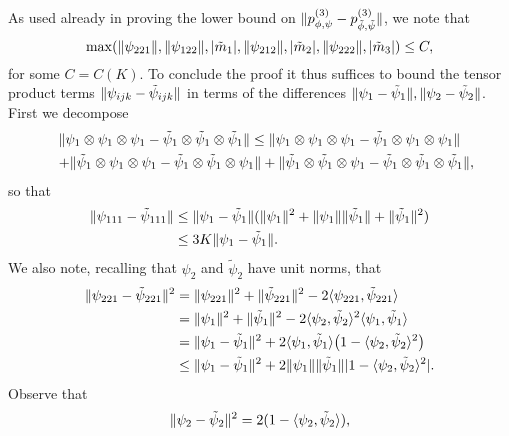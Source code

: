 \documentclass[journal]{IEEEtran}
\newcommand{\1}{\boldsymbol{1}}
\DeclarePairedDelimiter{\Inner}{\langle}{\rangle}
\DeclarePairedDelimiter{\brackets}{(}{)}
\DeclarePairedDelimiter{\norm}{\lVert}{\rVert}
\DeclarePairedDelimiter{\abs}{\lvert}{\rvert}
\begin{document}
As used already in proving the lower bound on $\norm{p^{(3)}_{\phi,\psi}-p^{(3)}_{\tilde{\phi},\tilde{\psi}}}$, we note that
\begin{equation*} %
	\max(\norm{\psi_{221}},\norm{\psi_{122}},\abs{\tilde{m}_1},\norm{\psi_{212}},\abs{\tilde{m}_2},\norm{\psi_{222}},\abs{\tilde{m}_3})\leq C,
\end{equation*}
for some $C=C(K)$.
To conclude the proof it thus suffices to bound the tensor product terms $\norm{\psi_{ijk}-\tilde{\psi}_{ijk}}$ in terms of the differences $\norm{\psi_1-\tilde{\psi}_1}, \norm{\psi_2-\tilde{\psi}_2}$.
First we decompose
\begin{multline*}
	\norm{\psi_1 \otimes \psi_1 \otimes \psi_1 - \tilde{\psi}_1 \otimes \tilde{\psi}_1 \otimes \tilde{\psi}_1}%
	\leq  \norm{\psi_1 \otimes \psi_1 \otimes \psi_1 - \tilde{\psi}_1 \otimes \psi_1 \otimes \psi_1}\\%
	\quad	+ \norm{\tilde{\psi}_1 \otimes \psi_1 \otimes \psi_1 - \tilde{\psi}_1 \otimes \tilde{\psi}_1 \otimes \psi_1}%
	+ \norm{\tilde{\psi}_1 \otimes \tilde{\psi}_1 \otimes \psi_1 - \tilde{\psi}_1 \otimes \tilde{\psi}_1 \otimes \tilde{\psi}_1},
\end{multline*}
so that
\begin{align}
  \norm{\psi_{111}-\tilde{\psi}_{111}}%
  &\leq \norm{\psi_1-\tilde{\psi}_1}(\norm{\psi_1}^2+\norm{\psi_1}\norm{\tilde{\psi}_1}+\norm{\tilde{\psi}_1}^2) \nonumber\\
  \label{eq:44}
  &\leq 3K\norm{\psi_1-\tilde{\psi}_1}.
\end{align}
We also note, recalling that $\psi_2$ and $\tilde{\psi}_2$ have unit norms, that
\begin{align*}
	\norm{\psi_{221} - \tilde{\psi}_{221}}^2%
	&= \norm{\psi_{221}}^2 + \norm{\tilde{\psi}_{221}}^2 - 2\Inner{\psi_{221},\tilde{\psi}_{221}}\\
	&= \norm{\psi_1}^2 + \norm{\tilde{\psi}_1}^2 - 2\Inner{\psi_2,\tilde{\psi}_2}^2\Inner{\psi_1,\tilde{\psi}_1}\\
	&= \norm{\psi_1 - \tilde{\psi}_1}^2 +2 \Inner{\psi_1,\tilde{\psi}_1}\brackets[\big]{1-\Inner{\psi_2,\tilde{\psi}_2}^2}\\
	&\leq \norm{\psi_1 - \tilde{\psi}_1}^2  + 2 \norm{\psi_1}\norm{\tilde{\psi}_1} \abs{1-\Inner{\psi_2,\tilde{\psi}_2}^2}.
\end{align*}
Observe that
\begin{equation}
	\label{eq:98}
	\norm{\psi_2 - \tilde{\psi}_2}^2%
	= 2(1 - \Inner{\psi_2,\tilde{\psi}_2}),
\end{equation}
\end{document}
